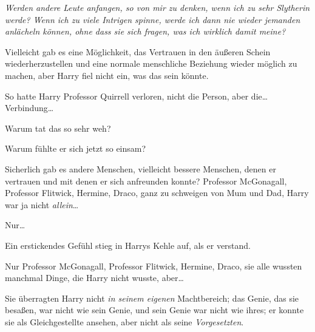 \emph{Werden andere Leute anfangen, so von mir zu denken, wenn ich zu sehr Slytherin werde? Wenn ich zu viele Intrigen spinne, werde ich dann nie wieder jemanden anlächeln können, ohne dass sie sich fragen, was ich wirklich damit meine?}

Vielleicht gab es eine Möglichkeit, das Vertrauen in den äußeren Schein wiederherzustellen und eine normale menschliche Beziehung wieder möglich zu machen, aber Harry fiel nicht ein, was das sein könnte.

So hatte Harry Professor Quirrell verloren, nicht die Person, aber die…Verbindung…

Warum tat das so sehr weh?

Warum fühlte er sich jetzt so einsam?

Sicherlich gab es andere Menschen, vielleicht bessere Menschen, denen er vertrauen und mit denen er sich anfreunden konnte? Professor McGonagall, Professor Flitwick, Hermine, Draco, ganz zu schweigen von Mum und Dad, Harry war ja nicht \emph{allein}…

Nur…

Ein erstickendes Gefühl stieg in Harrys Kehle auf, als er verstand.

Nur Professor McGonagall, Professor Flitwick, Hermine, Draco, sie alle wussten manchmal Dinge, die Harry nicht wusste, aber…

Sie überragten Harry nicht \emph{in seinem eigenen} Machtbereich; das Genie, das sie besaßen, war nicht wie sein Genie, und sein Genie war nicht wie ihres; er konnte sie als Gleichgestellte ansehen, aber nicht als seine \emph{Vorgesetzten}.

